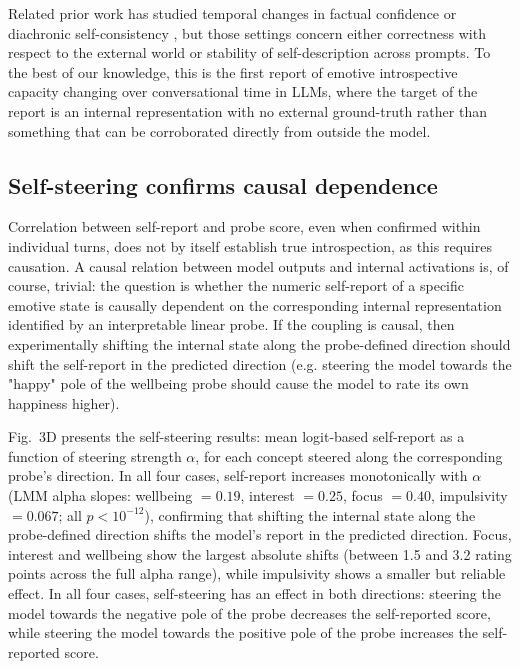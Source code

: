 \documentclass[10pt]{article}
\begin{document}
Related prior work has studied temporal changes in factual confidence or diachronic self-consistency \citep{ZhangMultiturn2026, Prestes2025}, but those settings concern either correctness with respect to the external world or stability of self-description across prompts. To the best of our knowledge, this is the first report of emotive introspective capacity changing over conversational time in LLMs, where the target of the report is an internal representation with no external ground-truth rather than something that can be corroborated directly from outside the model.

\subsection{Self-steering confirms causal dependence}
\label{sec:results-causal}

Correlation between self-report and probe score, even when confirmed within individual turns, does not by itself establish true introspection, as this requires causation. A causal relation between model outputs and internal activations is, of course, trivial: the question is whether the numeric self-report of a specific emotive state is causally dependent on the corresponding internal representation identified by an interpretable linear probe.
If the coupling is causal, then experimentally shifting the internal state along the probe-defined direction should shift the self-report in the predicted direction (e.g. steering the model towards the "happy" pole of the wellbeing probe should cause the model to rate its own happiness higher).

Fig.~3D presents the self-steering results: mean logit-based self-report as a function of steering strength $\alpha$, for each concept steered along the corresponding probe's direction.
In all four cases, self-report increases monotonically with $\alpha$ (LMM alpha slopes: wellbeing $= 0.19$, interest $= 0.25$, focus $= 0.40$, impulsivity $= 0.067$; all $p < 10^{-12}$), confirming that shifting the internal state along the probe-defined direction shifts the model's report in the predicted direction.
Focus, interest and wellbeing show the largest absolute shifts (between 1.5 and 3.2 rating points across the full alpha range), while impulsivity shows a smaller but reliable effect. In all four cases, self-steering has an effect in both directions: steering the model towards the negative pole of the probe decreases the self-reported score, while steering the model towards the positive pole of the probe increases the self-reported score.
\end{document}
